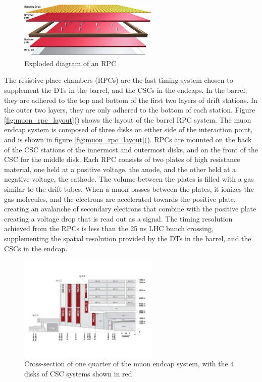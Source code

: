 \begin{figure}[h]
   \centering
  \includegraphics[width=0.6\textwidth]{Figures/CMS_Diagrams/Muon__RPC_schematic.jpg}
  \caption{Exploded diagram of an RPC} \label{fig:muon_rpc}
\end{figure}

\par The resistive place chambers (RPCs) are the fast timing system
chosen to supplement the DTs in the barrel, and the CSCs in the
endcaps.  In the barrel, they are adhered to the top and bottom of the
first two layers of drift stations.  In the outer two layers, they are
only adhered to the bottom of each station.  Figure
\ref{fig:muon_rpc_layout}() shows the
layout of the barrel RPC system.  The muon endcap system is composed
of three disks on either side of the interaction point, and is shown
in figure
\ref{fig:muon_rpc_layout}().  RPCs
are mounted on the back of the CSC stations of the innermost and
outermost disks, and on the front of the CSC for the middle disk. Each
RPC consists of two plates of high resistance material, one held at a
positive voltage, the anode, and the other held at a negative voltage, 
the cathode.  The volume between the plates is filled with a gas
similar to the drift tubes.  When a muon passes between the plates, it
ionizes the gas molecules, and the electrons are accelerated towards
the positive plate, creating an avalanche of secondary electrons that
combine with the positive plate creating a voltage drop that is read
out as a signal.  The timing resolution achieved from the RPCs is less
than the 25 ns LHC bunch crossing, supplementing the spatial
resolution provided by the DTs in the barrel, and the CSCs in the
endcap.  

\begin{figure}[h]
   \centering
  \includegraphics[width=0.6\textwidth]{Figures/CMS_Diagrams/Muon__Endcap_CSC_layout.pdf}
  \caption{Cross-section of one quarter of the muon endcap system,
    with the 4 disks of CSC systems shown in red} \label{fig:muon_csc_layout}
\end{figure}


